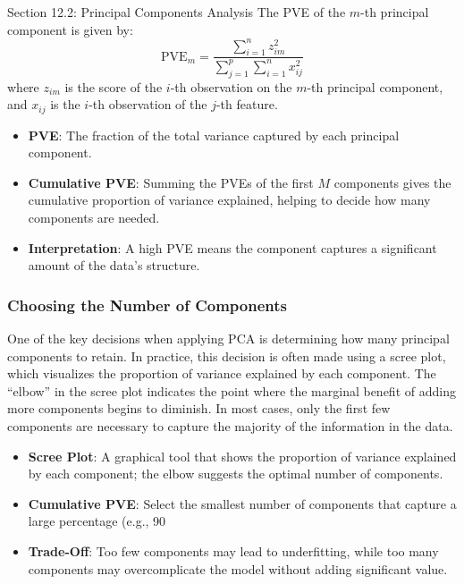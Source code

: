 \begin{notes}{Section 12.2: Principal Components Analysis}
    The PVE of the \(m\)-th principal component is given by:
    \[
    \text{PVE}_m = \frac{\sum_{i=1}^{n} z_{im}^2}{\sum_{j=1}^{p} \sum_{i=1}^{n} x_{ij}^2}
    \]
    where $z_{im}$ is the score of the \(i\)-th observation on the \(m\)-th principal component, and $x_{ij}$ is the \(i\)-th observation of the \(j\)-th feature.
    
    \begin{highlight}
        \begin{itemize}
            \item \textbf{PVE}: The fraction of the total variance captured by each principal component.
            \item \textbf{Cumulative PVE}: Summing the PVEs of the first \(M\) components gives the cumulative proportion of variance explained, helping to decide how many components are needed.
            \item \textbf{Interpretation}: A high PVE means the component captures a significant amount of the data’s structure.
        \end{itemize}
    \end{highlight}
    
    \subsubsection*{Choosing the Number of Components}
    
    One of the key decisions when applying PCA is determining how many principal components to retain. In practice, this decision is often made using a scree plot, which visualizes the proportion of variance explained 
    by each component. The “elbow” in the scree plot indicates the point where the marginal benefit of adding more components begins to diminish. In most cases, only the first few components are necessary to capture 
    the majority of the information in the data.
    
    \begin{highlight}
        \begin{itemize}
            \item \textbf{Scree Plot}: A graphical tool that shows the proportion of variance explained by each component; the elbow suggests the optimal number of components.
            \item \textbf{Cumulative PVE}: Select the smallest number of components that capture a large percentage (e.g., 90%
            \item \textbf{Trade-Off}: Too few components may lead to underfitting, while too many components may overcomplicate the model without adding significant value.
        \end{itemize}
    \end{highlight}
    

\end{notes}
